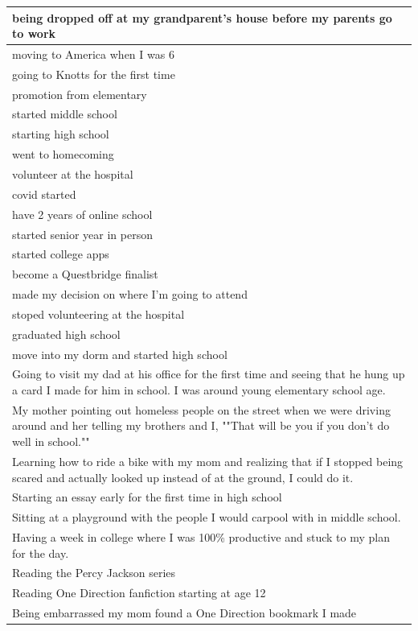 \documentclass[
  .7em,
  letterpaper,
  DIV=11,
  numbers=noendperiod]{scrartcl}
\begin{document}
\begin{table}
\begin{tabular}{l}
\hline
being dropped off at my grandparent's house before my parents go to work\\
\hline
moving to America when I was 6\\
\hline
going to Knotts for the first time\\
\hline
promotion from elementary\\
\hline
started middle school\\
\hline
starting high school\\
\hline
went to homecoming\\
\hline
volunteer at the hospital\\
\hline
covid started\\
\hline
have 2 years of online school\\
\hline
started senior year in person\\
\hline
started college apps\\
\hline
become a Questbridge finalist\\
\hline
made my decision on where I'm going to attend\\
\hline
stoped volunteering at the hospital\\
\hline
graduated high school\\
\hline
move into my dorm and started high school\\
\hline
Going to visit my dad at his office for the first time and seeing that he hung up a card I made for him in school. I was around young elementary school age.\\
\hline
My mother pointing out homeless people on the street when we were driving around and her telling my brothers and I, ""That will be you if you don't do well in school.""\\
\hline
Learning how to ride a bike with my mom and realizing that if I stopped being scared and actually looked up instead of at the ground, I could do it.\\
\hline
Starting an essay early for the first time in high school\\
\hline
Sitting at a playground with the people I would carpool with in middle school.\\
\hline
Having a week in college where I was 100\% productive and stuck to my plan for the day.\\
\hline
Reading the Percy Jackson series\\
\hline
Reading One Direction fanfiction starting at age 12\\
\hline
Being embarrassed my mom found a One Direction bookmark I made\\

\end{tabular}
\end{table}
\end{document}

